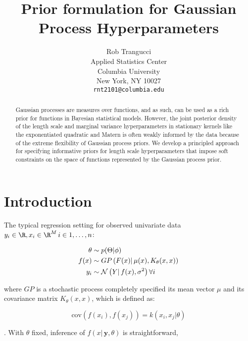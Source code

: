 \documentclass{article}
\title{Prior formulation for Gaussian Process Hyperparameters}
\author{
  Rob Trangucci \\
  Applied Statistics Center\\
  Columbia University\\
  New York, NY 10027 \\
  \texttt{rnt2101@columbia.edu} \\
}
\newcommand{\lp}{\ensuremath{\left(}}
\newcommand{\rp}{\ensuremath{\right)}}
\begin{document}

\maketitle

\begin{abstract}
  Gaussian processes are measures over functions, and as such, can be used as a
  rich prior for functions in Bayesian statistical models. However, the joint
  posterior density of the length scale and marginal variance hyperparameters
  in stationary kernels like the exponentiated quadratic and Matern
  is often weakly informed by the data because of the extreme flexibility of
  Gaussian process priors. We develop a principled approach for specifying
  informative priors for length scale hyperparameters that impose soft
  constraints on the space of functions represented by the Gaussian process
  prior. 
 \end{abstract}

\section{Introduction}

The typical regression setting for observed univariate data
$y_i \in \R, x_i \in \R^M\, i \in {1,\dots,n}$:

\begin{align*}
  \theta & \sim p(\Theta | \phi) \\
  f(x) & \sim GP\lp F(x) |\, \mu(x),
  K_\theta(x, x) \rp \\
  y_i & \sim \mathcal{N}\lp Y | \, f(x), \sigma^2 \rp \forall i \\
\end{align*}

where $GP$ is a stochastic process completely specified its mean vector $\mu$
and its covariance matrix $K_\theta(x, x)$, which is defined as:

\[
  \text{cov}(f(x_i), f(x_j)) = k(x_i, x_j | \theta) 
\]

.   With
$\theta$ fixed, inference of $f(x | \, \mathbf{y}, \theta)$ is straightforward,
\end{document}
